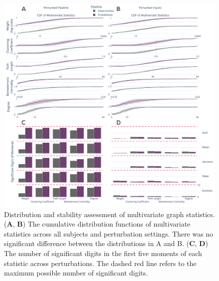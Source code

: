 \documentclass[fleqn,10pt]{SelfArx} %
\begin{document}
\begin{figure}[bt!]\centering
\includegraphics[width=\linewidth]{figures/fig2_multivariate_differences.pdf}
\caption{Distribution and stability assessment of multivariate graph statistics. (\textbf{A}, \textbf{B}) The
cumulative distribution functions of multivariate statistics across all subjects and perturbation settings. There was
no significant difference between the distributions in A and B. (\textbf{C}, \textbf{D}) The number of significant
digits in the first five moments of each statistic across perturbations. The dashed red line refers to the maximum
possible number of significant digits.}
\label{fig:multivar}
\end{figure}
\end{document}
